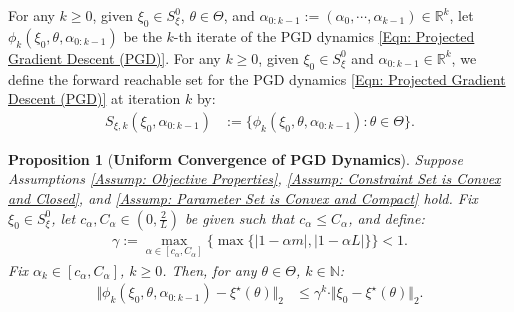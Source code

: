\documentclass[letterpaper, 10 pt, conference]{ieeeconf}
\newcommand{\N}{\mathbb{N}}
\newcommand{\R}{\mathbb{R}}
\newcommand{\?}{\stackrel{?}{=}}
\newcommand{\param}{\theta}
\newcommand{\paramSet}{\Theta}
\newcommand{\var}{\xi}
\newcommand{\varMap}{\phi}
\newcommand{\varOpt}{\var^\star}
\newcommand{\smoothnessConstant}{L}
\newcommand{\strongConvexityConstant}{m}
\newcommand{\ratePGD}{\alpha}
\newcommand{\ratePGDMin}{c_\ratePGD}
\newcommand{\ratePGDMax}{C_\ratePGD}
\newcommand{\convergenceRatePGD}{\gamma}
\newcommand{\varInitialSet}{S_\var^0}
\newcommand{\varForwardReachableSet}[1]{S_{\var, {#1}}}
\newtheorem{proposition}{Proposition}
\newcommand{\antoine}[1]{{\textcolor[rgb]{1,0,0}{\textsf{[Antoine: {#1}]}}}}
\begin{document}
For any $k \geq 0$,
given $\var_0 \in \varInitialSet$, $\param \in \paramSet$, and $\ratePGD_{0:k-1} := (\ratePGD_0, \cdots, \ratePGD_{k-1}) \in \R^k$, let $\varMap_k(\var_0, \param, \ratePGD_{0:k-1})$ be the $k$-th iterate 
of the PGD dynamics \eqref{Eqn: Projected Gradient Descent (PGD)}.
For any $k \geq 0$, given $\var_0 \in \varInitialSet$ and $\ratePGD_{0:k-1} \in \R^k$, we define 
the forward reachable set for the PGD dynamics \eqref{Eqn: Projected Gradient Descent (PGD)} at iteration $k$ by:
\begin{align}
\label{Eqn: Forward Reachable Set, def}
    \varForwardReachableSet{k}(\var_0, \ratePGD_{0:k-1}) &:= \{ \varMap_k(\var_0, \param, \ratePGD_{0:k-1}): \param \in \paramSet \}.
\end{align}



\begin{proposition}
[\textbf{Uniform Convergence of PGD Dynamics}]
\label{Prop: Convergence of PGD}
Suppose Assumptions \ref{Assump: Objective Properties}, \ref{Assump: Constraint Set is Convex and Closed}, and \ref{Assump: Parameter Set is Convex and Compact} hold. Fix $\var_0 \in \varInitialSet$, let $\ratePGDMin, \ratePGDMax \in (0, \frac{2}{\smoothnessConstant})$ be given such that $\ratePGDMin \leq \ratePGDMax$, and define:
\begin{align}
    \label{eq:PGD_convergence_rate}
    \textstyle\convergenceRatePGD := \max_{\ratePGD \in [\ratePGDMin, \ratePGDMax]} \big\{\max\{|1 - \ratePGD \strongConvexityConstant|, |1 - \ratePGD \smoothnessConstant| \} \big\} < 1.
\end{align}
Fix $\ratePGD_k \in [\ratePGDMin, \ratePGDMax]$, $k \geq 0$.
Then, 
for any $\param \in \paramSet$, $k \in \N$:
\begin{align}
    \label{Eqn: Exponential Bound for PGD Convergence}
    \Vert \varMap_k(\var_0, \param, \ratePGD_{0:k-1}) - \varOpt(\param) \Vert_2 &\leq \convergenceRatePGD^k \cdot \Vert \var_0 - \varOpt(\param) \Vert_2. 
\end{align}
\end{proposition}
\end{document}
